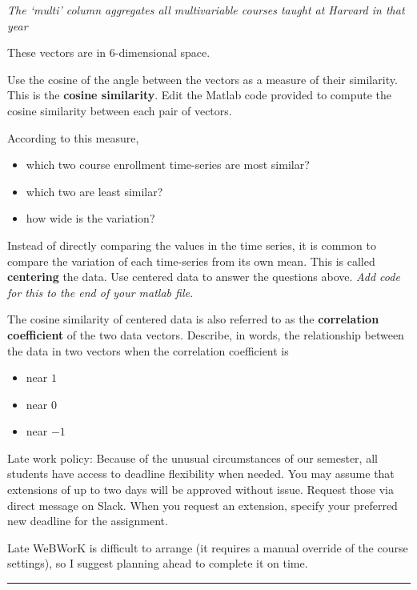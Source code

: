 \documentclass[12pt,letterpaper]{exam}
\begin{document}
\begin{questions}
\emph{The `multi' column aggregates all multivariable courses taught at Harvard in that year}

These vectors are in 6-dimensional space.
\begin{parts}
\item Use the cosine of the angle between the vectors as a measure of their similarity.  This is the \textbf{cosine similarity}.  Edit the Matlab code provided to compute the cosine similarity between each pair of vectors.

According to this measure, 
\begin{itemize}
    \item which two course enrollment time-series are most similar?
    \item which two are least similar?
    \item how wide is the variation?
\end{itemize}

\item Instead of directly comparing the values in the time series, it is common to compare the variation of each time-series from its own mean.  This is called \textbf{centering} the data.  Use centered data to answer the questions above.  \emph{Add code for this to the end of your matlab file.}

\item The cosine similarity of centered data is also referred to as the \textbf{correlation coefficient} of the two data vectors.  Describe, in words, the relationship between the data in two vectors when the correlation coefficient is
\begin{itemize}
    \item near $1$
    \item near $0$
    \item near $-1$
\end{itemize}
\end{parts}

\end{questions}


Late work policy:  Because of the unusual circumstances of our semester, all students have access to deadline flexibility when needed.  You may assume that extensions of up to two days will be approved without issue.  Request those via direct message on Slack.  When you request an extension, specify your preferred new deadline for the assignment.

Late WeBWorK is difficult to arrange (it requires a manual override of the course settings), so I suggest planning ahead to complete it on time.
\vspace{1cm} 
\hrule
\vspace{1cm}
\end{document}
